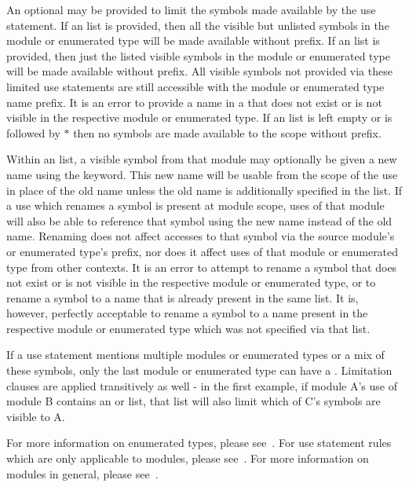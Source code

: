 
An optional  may be provided to limit the symbols made
available by the use statement.  If an  list is provided, then all
the visible but unlisted symbols in the module or enumerated type will be made
available without prefix.  If an  list is provided, then just the
listed visible symbols in the module or enumerated type will be made available
without prefix.  All visible symbols not provided via these limited use
statements are still accessible with the module or enumerated type name prefix.
It is an error to provide a name in a  that does not
exist or is not visible in the respective module or enumerated type.  If an
 list is left empty or  is followed by $*$ then no
symbols are made available to the scope without prefix.

Within an  list, a visible symbol from that module may optionally be
given a new name using the  keyword.  This new name will be usable from
the scope of the use in place of the old name unless the old name is
additionally specified in the  list.  If a use which renames a symbol
is present at module scope, uses of that module will also be able to reference
that symbol using the new name instead of the old name.  Renaming does not
affect accesses to that symbol via the source module's or enumerated type's
prefix, nor does it affect uses of that module or enumerated type from other
contexts.  It is an error to attempt to rename a symbol that does not exist or
is not visible in the respective module or enumerated type, or to rename a
symbol to a name that is already present in the same  list.  It is,
however, perfectly acceptable to rename a symbol to a name present in the
respective module or enumerated type which was not specified via
that  list.

If a use statement mentions multiple modules or enumerated types or a mix of
these symbols, only the last module or enumerated type can have a
.  Limitation clauses are applied transitively as well
- in the first example, if module A's use of module B contains an 
or  list, that list will also limit which of C's symbols are visible
to A.

For more information on enumerated types, please see~.
For use statement rules which are only applicable to modules, please
see~.  For more information on modules in general, please
see~.


